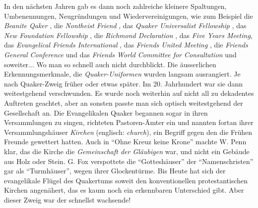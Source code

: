 In den nächsten Jahren gab es dann noch zahlreiche kleinere Spaltungen,
Umbenennungen, Neugründungen und Wiedervereinigungen, wie zum Beispiel die
\textit{Beanite Qaker} , die \textit{Nontheist
Friend} , das \textit{Quaker Universalist
Fellowship} , das \textit{New
Foundation Fellowship} , die
\textit{Richmond Declaration} , das \textit{Five
Years Meeting}, das \textit{Evangelical Friends International}
, das \textit{Friends United
Meeting} , die \textit{Friends General
Conference}  und das \textit{Friends
World Committee for Consultation} und soweiter... Wo man so schnell auch nicht
durchblickt.
Die äusserlichen Erkennungsmerkmale, die \textit{Quaker-Uniformen}
 wurden
langsam ausrangiert. Je nach Quaker-Zweig früher oder etwas später. Im 20.
Jahrhundert war sie dann weitestgehend verschwunden. Es wurde noch weiterhin auf
nicht all zu dekadentes Auftreten geachtet, aber an sonsten passte man sich
optisch weitestgehend der Gesellschaft an. Die Evangelikalen Quaker begannen
sogar in ihren Versammlungen zu singen, richteten Pastoren-Ämter ein und nannten
fortan ihrer Versammlungshäuser \textit{Kirchen} 
(englisch: \textit{church}),
ein Begriff gegen den die Frühen Freunde gewettert hatten. Auch in "`Ohne Kreuz
keine Krone"' machte W. Penn klar, das die Kirche die \textit{Gemeinschaft der
Gläubigen} war, und nicht ein Gebäude aus Holz oder Stein. G. Fox verspottete
die "`Gotteshäuser"' der "`Namenschristen"' gar als
"`Turmhäuser"', wegen ihrer
Glockentürme. Bis Heute hat sich der evangelikale Flügel des Quakertums soweit
den konventionellen protestantischen Kirchen angenähert, das es kaum noch ein
erkennbaren Unterschied gibt. Aber dieser Zweig war der schnellst wachsende!

\medskip

